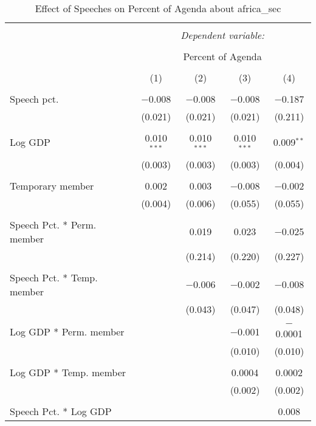 
\begin{table}[!htbp] \centering 
  \caption{Effect of Speeches on Percent of Agenda about  africa_sec} 
  \label{} 
\begin{tabular}{@{\extracolsep{5pt}}lcccc} 
\\[-1.8ex]\hline 
\hline \\[-1.8ex] 
 & \multicolumn{4}{c}{\textit{Dependent variable:}} \\ 
\cline{2-5} 
\\[-1.8ex] & \multicolumn{4}{c}{Percent of Agenda} \\ 
\\[-1.8ex] & (1) & (2) & (3) & (4)\\ 
\hline \\[-1.8ex] 
 Speech pct. & $-$0.008 & $-$0.008 & $-$0.008 & $-$0.187 \\ 
  & (0.021) & (0.021) & (0.021) & (0.211) \\ 
  & & & & \\ 
 Log GDP & 0.010$^{***}$ & 0.010$^{***}$ & 0.010$^{***}$ & 0.009$^{**}$ \\ 
  & (0.003) & (0.003) & (0.003) & (0.004) \\ 
  & & & & \\ 
 Temporary member & 0.002 & 0.003 & $-$0.008 & $-$0.002 \\ 
  & (0.004) & (0.006) & (0.055) & (0.055) \\ 
  & & & & \\ 
 Speech Pct. * Perm. member &  & 0.019 & 0.023 & $-$0.025 \\ 
  &  & (0.214) & (0.220) & (0.227) \\ 
  & & & & \\ 
 Speech Pct. * Temp. member &  & $-$0.006 & $-$0.002 & $-$0.008 \\ 
  &  & (0.043) & (0.047) & (0.048) \\ 
  & & & & \\ 
 Log GDP * Perm. member &  &  & $-$0.001 & $-$0.0001 \\ 
  &  &  & (0.010) & (0.010) \\ 
  & & & & \\ 
 Log GDP * Temp. member &  &  & 0.0004 & 0.0002 \\ 
  &  &  & (0.002) & (0.002) \\ 
  & & & & \\ 
 Speech Pct. * Log GDP &  &  &  & 0.008 \\ 

\end{tabular}
\end{table}
